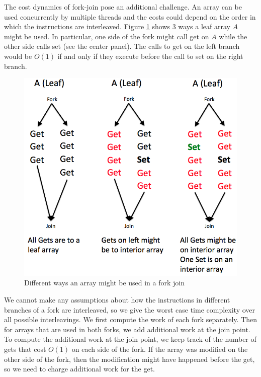 \documentclass[preprint]{sigplanconf}
\begin{document}
The cost dynamics of fork-join pose an additional challenge. An array can be used concurrently by multiple threads and the costs could depend on the order in which the instructions are interleaved. Figure \ref{fig:fork_join_intuition} shows 3 ways a leaf array $A$ might be used. In particular, one side of the fork might call get on $A$ while the other side calls set (see the center panel). The calls to get on the left branch would be $O(1)$ if and only if they execute before the call to set on the right branch.

\begin{figure}[!ht]
\centering
\includegraphics[scale=0.3]{fork_join_intuition}
\nocaptionrule \caption{Different ways an array might be used in a fork join}
\label{fig:fork_join_intuition}
\end{figure}

We cannot make any assumptions about how the instructions in different branches of a fork are interleaved, so we give the worst case time complexity over all possible interleavings. We first compute the work of each fork separately. Then for arrays that are used in both forks, we add additional work at the join point. To compute the additional work at the join point, we keep track of the number of gets that cost $O(1)$ on each side of the fork. If the array was modified on the other side of the fork, then the modification might have happened before the get, so we need to charge additional work for the get.
\end{document}
